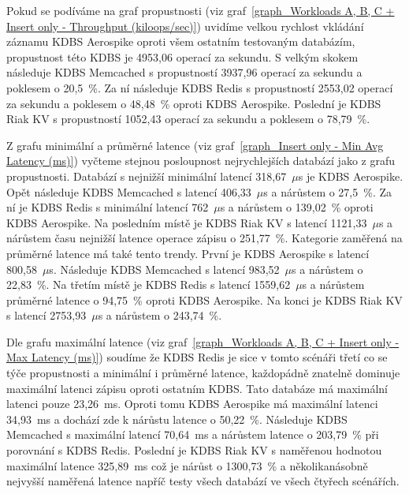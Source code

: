 \documentclass[czech,master,dept460,male,csharp,cpdeclaration]{diploma}
\begin{document}
	Pokud se podíváme na graf propustnosti (viz graf~\ref{graph_Workloads A, B, C + Insert only - Throughput (kiloops/sec)}) uvidíme velkou rychlost vkládání záznamu KDBS Aerospike oproti všem ostatním testovaným databázím, propustnost této KDBS je 4953,06 operací za sekundu. S velkým skokem následuje KDBS Memcached s propustností 3937,96 operací za sekundu a poklesem o 20,5~\%. Za ní následuje KDBS Redis s propustností 2553,02 operací za sekundu a poklesem o 48,48~\% oproti KDBS Aerospike. Poslední je KDBS Riak KV s propustností 1052,43 operací za sekundu a poklesem o 78,79~\%.
	
	Z grafu minimální a průměrné latence (viz graf~\ref{graph_Insert only - Min Avg Latency (ms)}) vyčteme stejnou posloupnost nejrychlejších databází jako z grafu propustnosti. Databází s nejnižší minimální latencí 318,67~$\mu$s je KDBS Aerospike. Opět následuje KDBS Memcached s latencí 406,33~$\mu$s a nárůstem o 27,5~\%. Za ní je KDBS Redis s minimální latencí 762~$\mu$s a nárůstem o 139,02~\% oproti KDBS Aerospike. Na posledním místě je KDBS Riak KV s latencí 1121,33~$\mu$s a nárůstem času nejnižší latence operace zápisu o 251,77~\%. Kategorie zaměřená na průměrné latence má také tento trendy. První je KDBS Aerospike s latencí 800,58~$\mu$s. Následuje KDBS Memcached s latencí 983,52~$\mu$s a nárůstem o 22,83~\%. Na třetím místě je KDBS Redis s latencí 1559,62~$\mu$s a nárůstem průměrné latence o 94,75~\% oproti KDBS Aerospike. Na konci je KDBS Riak KV s latencí 2753,93~$\mu$s a nárůstem o 243,74~\%.
	
	Dle grafu maximální latence (viz graf~\ref{graph_Workloads A, B, C + Insert only - Max Latency (ms)}) soudíme že KDBS Redis je sice v tomto scénáři třetí co se týče propustnosti a minimální i průměrné latence, každopádně znatelně dominuje maximální latenci zápisu oproti ostatním KDBS. Tato databáze má maximální latenci pouze 23,26~ms. Oproti tomu KDBS Aerospike má maximální latenci 34,93~ms a dochází zde k nárůstu latence o 50,22~\%. Následuje KDBS Memcached s maximální latencí 70,64~ms a nárůstem latence o 203,79~\% při porovnání s KDBS Redis. Poslední je KDBS Riak KV s naměřenou hodnotou maximální latence 325,89~ms což je nárůst o 1300,73~\% a několikanásobně nejvyšší naměřená latence napříč testy všech databází ve všech čtyřech scénářích.
	
\end{document}
